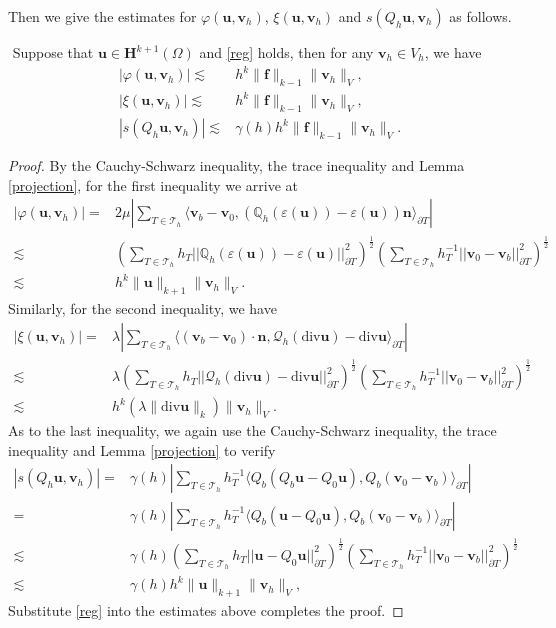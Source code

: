 \documentclass[leqno,CJK]{siamltex704}
\numberwithin{equation}{section}
\def\Q{{\mathcal{Q}}}
\def\dQ{{\mathbb{Q}}}
\def\sumT{\sum_{T\in\mathcal{T}_h}}     %
\def\bu{{\mathbf{u}}}
\def\bv{{\mathbf{v}}}
\def\bh{{\mathbf{H}}}
\def\bn{{\mathbf{n}}}
\def\bf{{\mathbf{f}}}
\newcommand{\di}{\text{div}}
\newcommand{\la}{\langle}
\newcommand{\ra}{\rangle_{\partial T}}
\begin{document}
Then we give the estimates for $\varphi(\bu,\bv_h)$, $\xi(\bu,\bv_h)$ and $s(Q_h\bu,\bv_h)$ as follows.
\begin{lemma}$\label{errest}$
	Suppose that $\bu\in \bh^{k+1}(\Omega)$ and \eqref{reg} holds, then for any $\bv_h\in V_h$, we have
	\begin{align*}
		|\varphi(\bu,\bv_h)|\lesssim& h^k\|\bf\|_{k-1}\|\bv_h\|_V,\\
		|\xi(\bu,\bv_h)|\lesssim&h^k\|\bf\|_{k-1}\|\bv_h\|_V,\\
		|s(Q_h\bu,\bv_h)|\lesssim&\gamma(h)h^k\|\bf\|_{k-1}\|\bv_h\|_V.
	\end{align*}
\end{lemma}
\begin{proof}
	By the Cauchy-Schwarz inequality, the trace inequality and Lemma \ref{projection}, for the first inequality we arrive at
	\begin{align*}
		|\varphi(\bu,\bv_h)|=&
		2\mu\left|\sumT\la \bv_b-\bv_0,(\dQ_h(\varepsilon(\bu))-\varepsilon(\bu))\bn\ra\right|
		\\
		\lesssim& 
		\left(\sumT h_T||\mathbb{Q}_h(\varepsilon(\bu))-\varepsilon(\bu)||_{\partial T}^2\right)^{\frac12}\left(\sumT h_T^{-1}||\bv_0-\bv_b||_{\partial T}^2\right)^{\frac12}
		\\
		\lesssim& 
		h^k\|\bu\|_{k+1}\|\bv_h\|_V.
	\end{align*}
	Similarly, for the second inequality, we have
	\begin{align*}
		|\xi(\bu,\bv_h)|=&
		\lambda\left|\sumT\la (\bv_b-\bv_0)\cdot\bn,\Q_h(\di\bu)-\di\bu\ra\right|
		\\
		\lesssim&
		\lambda\left(\sumT h_T||\Q_h(\di\bu)-\di\bu||_{\partial T}^2\right)^{\frac12}\left(\sumT h_T^{-1}||\bv_0-\bv_b||_{\partial T}^2\right)^{\frac12}
		\\
		\lesssim& 
		h^k(\lambda\|\di\bu\|_k)\|\bv_h\|_V.
	\end{align*}
	As to the last inequality, we again use the Cauchy-Schwarz inequality, the trace inequality and Lemma \ref{projection} to verify
	\begin{align*}
	|s(Q_h\bu,\bv_h)|=&
	\gamma(h)\left|\sumT h_T^{-1}\la Q_b(Q_b\bu-Q_0\bu),Q_b (\bv_0-\bv_b)\ra\right|
	\\
	=&
	\gamma(h)\left|\sumT h_T^{-1}\la Q_b(\bu-Q_0\bu),Q_b (\bv_0-\bv_b)\ra\right|
	\\
	\lesssim&
	\gamma(h)\left(\sumT h_T||\bu-Q_0\bu||_{\partial T}^2\right)^{\frac12}\left(\sumT h_T^{-1}||\bv_0-\bv_b||_{\partial T}^2\right)^{\frac12}
	\\
	\lesssim&
	\gamma(h)h^k\|\bu\|_{k+1}\|\bv_h\|_V,
\end{align*}
    Substitute \eqref{reg} into the estimates above completes the proof.
\end{proof}
\end{document}

